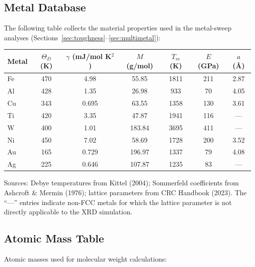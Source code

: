 \documentclass[11pt,a4paper]{article}
\begin{document}
\subsection{Metal Database}

The following table collects the material properties used in the
metal-sweep analyses (Sections~\ref{sec:toughness}--\ref{sec:multimetal}):

\begin{center}
\small
\begin{tabular}{lcccccc}
\toprule
\textbf{Metal} & \textbf{$\Theta_D$ (K)} & \textbf{$\gamma$ (mJ/mol K$^2$)}
  & \textbf{$M$ (g/mol)} & \textbf{$T_m$ (K)} & \textbf{$E$ (GPa)}
  & \textbf{$a$ (\AA)} \\
\midrule
Fe & 470  & 4.98  & 55.85  & 1811 & 211 & 2.87 \\
Al & 428  & 1.35  & 26.98  & 933  & 70  & 4.05 \\
Cu & 343  & 0.695 & 63.55  & 1358 & 130 & 3.61 \\
Ti & 420  & 3.35  & 47.87  & 1941 & 116 & --- \\
W  & 400  & 1.01  & 183.84 & 3695 & 411 & --- \\
Ni & 450  & 7.02  & 58.69  & 1728 & 200 & 3.52 \\
Au & 165  & 0.729 & 196.97 & 1337 & 79  & 4.08 \\
Ag & 225  & 0.646 & 107.87 & 1235 & 83  & --- \\
\bottomrule
\end{tabular}
\end{center}

\noindent Sources: Debye temperatures from Kittel (2004); Sommerfeld
coefficients from Ashcroft \& Mermin (1976); lattice parameters from
CRC Handbook (2023).  The ``---'' entries indicate non-FCC metals for
which the lattice parameter is not directly applicable to the XRD
simulation.

\subsection{Atomic Mass Table}

Atomic masses used for molecular weight calculations:
\end{document}
